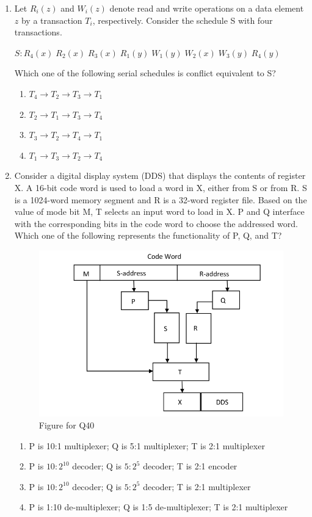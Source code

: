 \begin{enumerate}
\hfill{}

\item Let $R_i(z)$ and $W_i(z)$ denote read and write operations on a data element $z$ by a transaction $T_i$, respectively. Consider the schedule S with four transactions.  

$S: R_4(x)\;R_2(x)\;R_3(x)\;R_1(y)\;W_1(y)\;W_2(x)\;W_3(y)\;R_4(y)$  

Which one of the following serial schedules is conflict equivalent to S?  

\begin{enumerate}
\item $T_4 \to T_2 \to T_3 \to T_1$
\item $T_2 \to T_1 \to T_3 \to T_4$
\item $T_3 \to T_2 \to T_4 \to T_1$
\item $T_1 \to T_3 \to T_2 \to T_4$
\end{enumerate}

\hfill{}

\item Consider a digital display system (DDS) that displays the contents of register X. A 16-bit code word is used to load a word in X, either from S or from R. S is a 1024-word memory segment and R is a 32-word register file. Based on the value of mode bit M, T selects an input word to load in X. P and Q interface with the corresponding bits in the code word to choose the addressed word. Which one of the following represents the functionality of P, Q, and T?  
\begin{figure}[H]
\centering
\includegraphics[width=0.8\columnwidth]{figs/q40.png}
\caption{Figure for Q40}
\label{fig:q40}
\end{figure}
\begin{enumerate}
\item P is 10:1 multiplexer; Q is 5:1 multiplexer; T is 2:1 multiplexer
\item P is $10:2^{10}$ decoder; Q is $5:2^5$ decoder; T is 2:1 encoder
\item P is $10:2^{10}$ decoder; Q is $5:2^5$ decoder; T is 2:1 multiplexer
\item P is 1:10 de-multiplexer; Q is 1:5 de-multiplexer; T is 2:1 multiplexer
\end{enumerate}


\end{enumerate}
